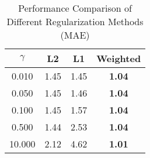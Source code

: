 \begin{table}[htbp]
\centering
\caption{Performance Comparison of Different Regularization Methods (MAE)}
\label{tab:method_comparison}
\begin{tabular}{cccc}
\hline
$\gamma$ & L2 & L1 & Weighted \\
\hline
0.010 & 1.45 & 1.45 & \textbf{1.04} \\
0.050 & 1.45 & 1.46 & \textbf{1.04} \\
0.100 & 1.45 & 1.57 & \textbf{1.04} \\
0.500 & 1.44 & 2.53 & \textbf{1.04} \\
10.000 & 2.12 & 4.62 & \textbf{1.01} \\
\hline
\end{tabular}
\end{table}
